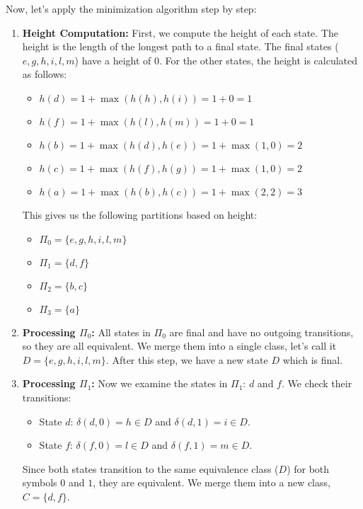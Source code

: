 \begin{example}
    Now, let's apply the minimization algorithm step by step:
    \begin{enumerate}
        \item \textbf{Height Computation:} First, we compute the height of each state. The height is the length of the longest path to a final state. The final states ($e, g, h, i, l, m$) have a height of 0. For the other states, the height is calculated as follows:
        \begin{itemize}
            \item $h(d) = 1 + \max(h(h), h(i)) = 1 + 0 = 1$
            \item $h(f) = 1 + \max(h(l), h(m)) = 1 + 0 = 1$
            \item $h(b) = 1 + \max(h(d), h(e)) = 1 + \max(1, 0) = 2$
            \item $h(c) = 1 + \max(h(f), h(g)) = 1 + \max(1, 0) = 2$
            \item $h(a) = 1 + \max(h(b), h(c)) = 1 + \max(2, 2) = 3$
        \end{itemize}
        This gives us the following partitions based on height:
        \begin{itemize}
            \item $\Pi_0 = \{e, g, h, i, l, m\}$
            \item $\Pi_1 = \{d, f\}$
            \item $\Pi_2 = \{b, c\}$
            \item $\Pi_3 = \{a\}$
        \end{itemize}

        \item \textbf{Processing $\Pi_0$:} All states in $\Pi_0$ are final and have no outgoing transitions, so they are all equivalent. We merge them into a single class, let's call it $D = \{e, g, h, i, l, m\}$. After this step, we have a new state $D$ which is final.

        \item \textbf{Processing $\Pi_1$:} Now we examine the states in $\Pi_1$: $d$ and $f$. We check their transitions:
        \begin{itemize}
            \item State $d$: $\delta(d, 0) = h \in D$ and $\delta(d, 1) = i \in D$.
            \item State $f$: $\delta(f, 0) = l \in D$ and $\delta(f, 1) = m \in D$.
        \end{itemize}
        Since both states transition to the same equivalence class ($D$) for both symbols $0$ and $1$, they are equivalent. We merge them into a new class, $C = \{d, f\}$.


\end{enumerate}
\end{example}
